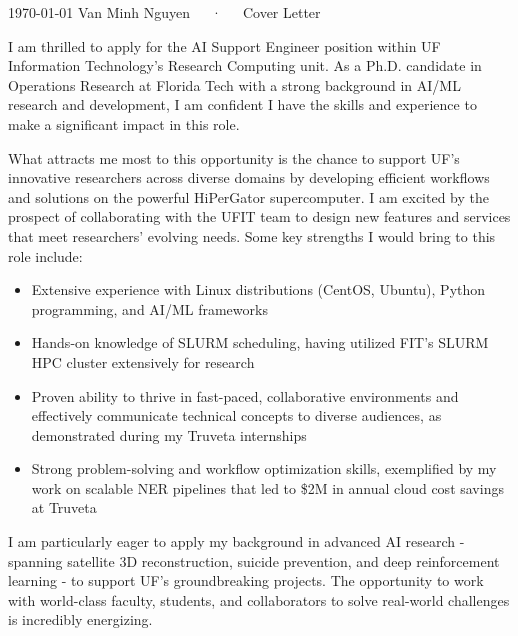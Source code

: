 \documentclass[11pt, letterpaper]{awesome-cv}
\begin{document}
\makecvheader[R]

\makecvfooter
  {\today}
  {Van Minh Nguyen~~~·~~~Cover Letter}
  {}

\makelettertitle

\begin{cvletter}

  I am thrilled to apply for the AI Support Engineer position within UF Information Technology's Research Computing unit. As a Ph.D. candidate in Operations Research at Florida Tech with a strong background in AI/ML research and development, I am confident I have the skills and experience to make a significant impact in this role.

  What attracts me most to this opportunity is the chance to support UF's innovative researchers across diverse domains by developing efficient workflows and solutions on the powerful HiPerGator supercomputer. I am excited by the prospect of collaborating with the UFIT team to design new features and services that meet researchers' evolving needs.
  Some key strengths I would bring to this role include:

  \begin{itemize}
    \item   Extensive experience with Linux distributions (CentOS, Ubuntu), Python programming, and AI/ML frameworks
    \item   Hands-on knowledge of SLURM scheduling, having utilized FIT's SLURM HPC cluster extensively for research
    \item   Proven ability to thrive in fast-paced, collaborative environments and effectively communicate technical concepts to diverse audiences, as demonstrated during my Truveta internships
    \item   Strong problem-solving and workflow optimization skills, exemplified by my work on scalable NER pipelines that led to \$2M in annual cloud cost savings at Truveta
  \end{itemize}
  
  
  I am particularly eager to apply my background in advanced AI research - spanning satellite 3D reconstruction, suicide prevention, and deep reinforcement learning - to support UF's groundbreaking projects. The opportunity to work with world-class faculty, students, and collaborators to solve real-world challenges is incredibly energizing.


\end{cvletter}
\end{document}
